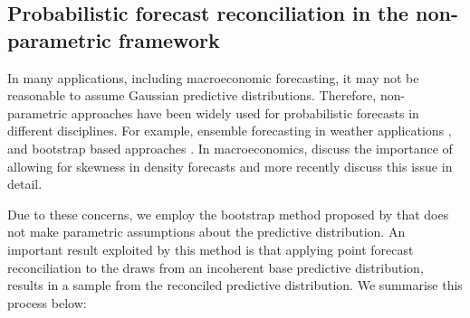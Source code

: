 \documentclass[graybox]{svmult}
\begin{document}
\subsection{Probabilistic forecast reconciliation in the non-parametric framework}\label{sec:probrecnp}

In many applications, including macroeconomic forecasting, it may not be reasonable to assume Gaussian predictive distributions. Therefore, non-parametric approaches have been widely used for probabilistic forecasts in different disciplines. For example, ensemble forecasting in weather applications \citep{GneRaf2005,Gneiting2014,Gneiting2008}, and bootstrap based approaches \citep{Manzan2008,Vilar2013}. In macroeconomics, \citet{CogEtAl2005} discuss the importance of allowing for skewness in density forecasts and more recently \citet{SmiVah2016} discuss this issue in detail.

Due to these concerns, we employ the bootstrap method proposed by \citet{GamEtAl2018} that does not make parametric assumptions about the predictive distribution. An important result exploited by this method is that applying point forecast reconciliation to the draws from an incoherent base predictive distribution, results in a sample from the reconciled predictive distribution. We summarise this process below:
\end{document}

